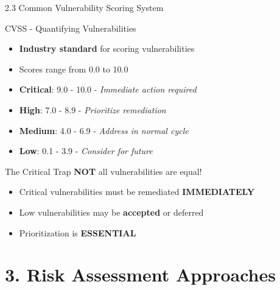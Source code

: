 \documentclass[9pt]{beamer}  %
\begin{document}
	\begin{frame}{2.3 Common Vulnerability Scoring System}
		\begin{block}{CVSS - Quantifying Vulnerabilities}
			\begin{itemize}
				\item \textbf{Industry standard} for scoring vulnerabilities
				\item Scores range from 0.0 to 10.0
				\item \textbf{Critical}: 9.0 - 10.0 - \textit{Immediate action required}
				\item \textbf{High}: 7.0 - 8.9 - \textit{Prioritize remediation}
				\item \textbf{Medium}: 4.0 - 6.9 - \textit{Address in normal cycle}
				\item \textbf{Low}: 0.1 - 3.9 - \textit{Consider for future}
			\end{itemize}
		\end{block}
		
		\begin{alertblock}{The Critical Trap}
			\textbf{NOT} all vulnerabilities are equal!
			\begin{itemize}
				\item Critical vulnerabilities must be remediated \textbf{IMMEDIATELY}
				\item Low vulnerabilities may be \textbf{accepted} or deferred
				\item Prioritization is \textbf{ESSENTIAL}
			\end{itemize}
		\end{alertblock}
	\end{frame}
	
	\section{3. Risk Assessment Approaches}
	
\end{document}
